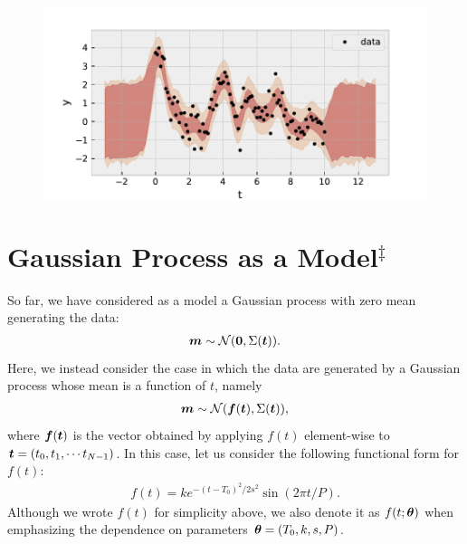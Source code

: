 \begin{figure}[htb]
\begin{center}
\includegraphics[width=\linewidth]{fig/gp/gp6.pdf}
\caption{\label{fig:gp6}}
\end{center}
\end{figure}


\section{Gaussian Process as a Model$^\ddagger$}

So far, we have considered as a model a Gaussian process with zero mean generating the data:
\begin{align}
\boldsymbol{m} \sim \mathcal{N} ({\bf 0},\Sigma(\boldsymbol{t})).
\end{align}
Here, we instead consider the case in which the data are generated by a Gaussian process whose mean is a function of $t$, namely
\begin{align}
\label{eq:modelgp}
\boldsymbol{m} \sim \mathcal{N} (\boldsymbol{f}(\boldsymbol{t}),\Sigma(\boldsymbol{t})),
\end{align}
where $\boldsymbol{f}(\boldsymbol{t})$ is the vector obtained by applying $f(t)$ element-wise to $\boldsymbol{t}=(t_0,t_1,\cdots t_{N-1})$. In this case, let us consider the following functional form for $f(t)$:
\begin{align}
f(t) = k e^{-(t-T_0)^2/2 s^2} \sin{(2 \pi t/P)}.
\end{align}
Although we wrote $f(t)$ for simplicity above, we also denote it as $f(t;\boldsymbol{\theta})$ when emphasizing the dependence on parameters $\boldsymbol{\theta}=(T_0,k,s,P)$.

